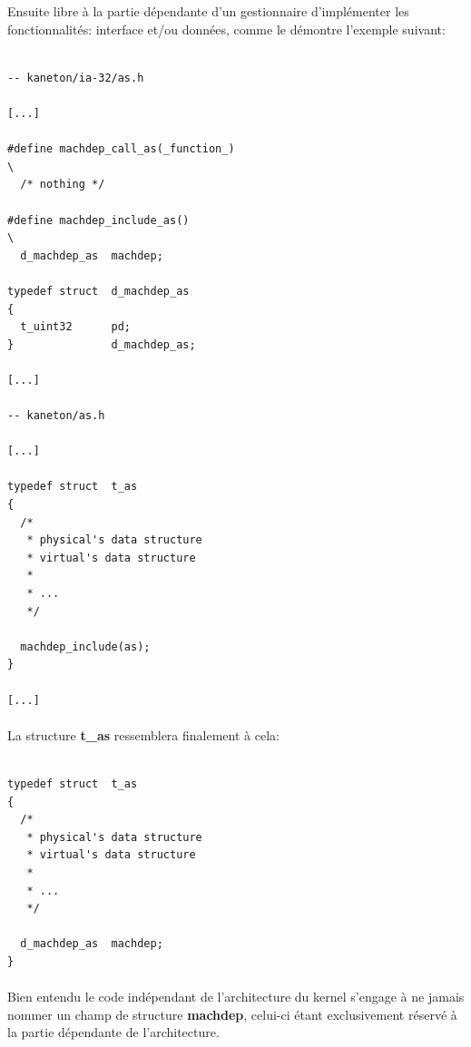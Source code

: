 \documentclass[10pt,a4wide]{article}
\begin{document}
Ensuite libre \`a la partie d\'ependante d'un gestionnaire d'impl\'ementer
les fonctionnalit\'es: interface et/ou donn\'ees, comme le d\'emontre
l'exemple suivant:

\begin{verbatim}

-- kaneton/ia-32/as.h

[...]

#define machdep_call_as(_function_)                                     \
  /* nothing */

#define machdep_include_as()                                            \
  d_machdep_as  machdep;

typedef struct  d_machdep_as
{
  t_uint32      pd;
}               d_machdep_as;

[...]

-- kaneton/as.h

[...]

typedef struct  t_as
{
  /*
   * physical's data structure
   * virtual's data structure
   *
   * ...
   */

  machdep_include(as);
}

[...]

\end{verbatim}

\paragraph{}

La structure \textbf{t\_as} ressemblera finalement \`a cela:

\begin{verbatim}

typedef struct  t_as
{
  /*
   * physical's data structure
   * virtual's data structure
   *
   * ...
   */

  d_machdep_as  machdep;
}

\end{verbatim}

\paragraph{}

Bien entendu le code ind\'ependant de l'architecture du kernel s'engage
\`a ne jamais nommer un champ de structure \textbf{machdep}, celui-ci
\'etant exclusivement r\'eserv\'e \`a la partie d\'ependante de l'architecture.

\paragraph{}
\end{document}
